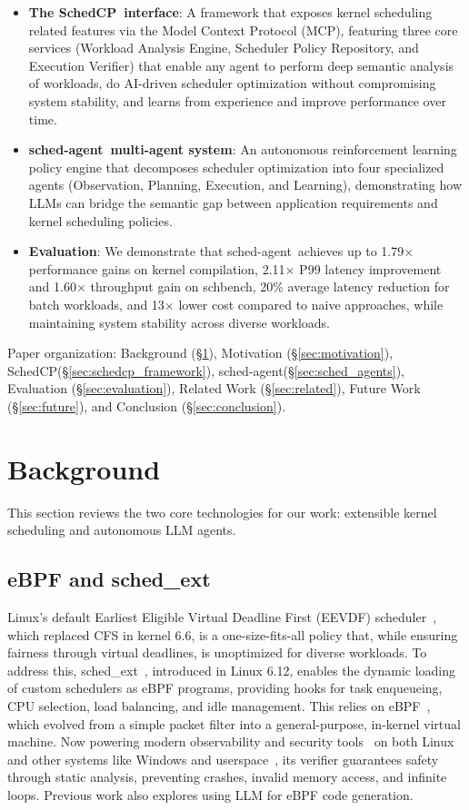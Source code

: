 \documentclass[preprint]{article}
\newcommand{\sys}{SchedCP\xspace}
\newcommand{\agent}{sched-agent\xspace}
\begin{document}
\begin{itemize}
    \item \textbf{The \sys\ interface}: A framework that exposes kernel scheduling related features via the Model Context Protocol (MCP), featuring three core services (Workload Analysis Engine, Scheduler Policy Repository, and Execution Verifier) that enable any agent to perform deep semantic analysis of workloads, do AI-driven scheduler optimization without compromising system stability, and learns from experience and improve performance over time.
    \item \textbf{\agent\ multi-agent system}: An autonomous reinforcement learning policy engine that decomposes scheduler optimization into four specialized agents (Observation, Planning, Execution, and Learning), demonstrating how LLMs can bridge the semantic gap between application requirements and kernel scheduling policies.
    \item \textbf{Evaluation}: We demonstrate that \agent\ achieves up to 1.79× performance gains on kernel compilation, 2.11× P99 latency improvement and 1.60× throughput gain on schbench, 20\% average latency reduction for batch workloads, and 13× lower cost compared to naive approaches, while maintaining system stability across diverse workloads.
\end{itemize}

Paper organization: Background (§\ref{sec:background}), Motivation (§\ref{sec:motivation}), \sys (§\ref{sec:schedcp_framework}), \agent (§\ref{sec:sched_agents}), Evaluation (§\ref{sec:evaluation}), Related Work (§\ref{sec:related}), Future Work (§\ref{sec:future}), and Conclusion (§\ref{sec:conclusion}).
\section{Background}
\label{sec:background}

This section reviews the two core technologies for our work: extensible kernel scheduling and autonomous LLM agents.

\subsection{eBPF and sched\_ext}

Linux's default Earliest Eligible Virtual Deadline First (EEVDF) scheduler~\cite{eevdf2024}, which replaced CFS in kernel 6.6, is a one-size-fits-all policy that, while ensuring fairness through virtual deadlines, is unoptimized for diverse workloads. To address this, sched\_ext~\cite{schedext2024}, introduced in Linux 6.12, enables the dynamic loading of custom schedulers as eBPF programs, providing hooks for task enqueueing, CPU selection, load balancing, and idle management. This relies on eBPF~\cite{ebpfio}, which evolved from a simple packet filter into a general-purpose, in-kernel virtual machine. Now powering modern observability and security tools~\cite{tracee,cilium} on both Linux and other systems like Windows and userspace~\cite{zheng2025extending, windows-ebpf}, its verifier guarantees safety through static analysis, preventing crashes, invalid memory access, and infinite loops. Previous work also explores using LLM for eBPF code generation\cite{kgent}.
\end{document}
